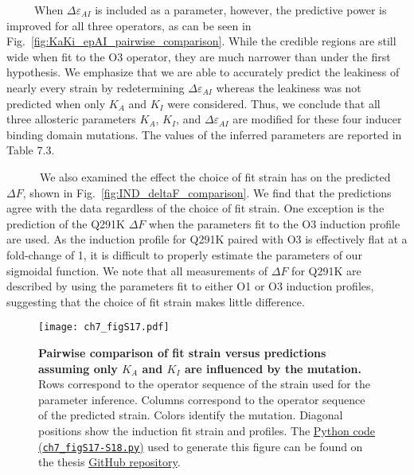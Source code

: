 \documentclass[12pt]{caltech_thesis}
\begin{document}
~~~~~When \(\Delta\varepsilon_{AI}\) is included as a parameter,
however, the predictive power is improved for all three operators, as
can be seen in Fig.~\ref{fig:KaKi_epAI_pairwise_comparison}. While the
credible regions are still wide when fit to the O3 operator, they are
much narrower than under the first hypothesis. We emphasize that we are
able to accurately predict the leakiness of nearly every strain by
redetermining \(\Delta\varepsilon_{AI}\) whereas the leakiness was not
predicted when only \(K_A\) and \(K_I\) were considered. Thus, we
conclude that all three allosteric parameters \(K_A\), \(K_I\), and
\(\Delta\varepsilon_{AI}\) are modified for these four inducer binding
domain mutations. The values of the inferred parameters are reported in
Table 7.3.

~~~~~~We also examined the effect the choice of fit strain has on the
predicted \(\Delta F\), shown in Fig.~\ref{fig:IND_deltaF_comparison}.
We find that the predictions agree with the data regardless of the
choice of fit strain. One exception is the prediction of the Q291K
\(\Delta F\) when the parameters fit to the O3 induction profile are
used. As the induction profile for Q291K paired with O3 is effectively
flat at a fold-change of 1, it is difficult to properly estimate the
parameters of our sigmoidal function. We note that all measurements of
\(\Delta F\) for Q291K are described by using the parameters fit to
either O1 or O3 induction profiles, suggesting that the choice of fit
strain makes little difference.

\hypertarget{fig:KaKi_only_pairwise_comparison}{%
\begin{figure}
\centering
\texttt{[image: ch7\_figS17.pdf]}
\caption[{Pairwise comparison of fit strain versus predictions assuming
only \(K_A\) and \(K_I\) are influenced by mutations in the inducer
binding domain.}]{\textbf{Pairwise comparison of fit strain versus
predictions assuming only \(K_A\) and \(K_I\) are influenced by the
mutation.} Rows correspond to the operator sequence of the strain used
for the parameter inference. Columns correspond to the operator sequence
of the predicted strain. Colors identify the mutation. Diagonal
positions show the induction fit strain and profiles. The
\href{https://github.com/gchure/phd/blob/master/src/chapter_07/code/ch7_figS17-S18.py}{Python
code\\
(\texttt{ch7\_figS17-S18.py})} used to generate this figure can be found
on the thesis \href{https://github.com/gchure/phd}{GitHub repository}.}
\label{fig:KaKi_only_pairwise_comparison}
\end{figure}
}
\end{document}

